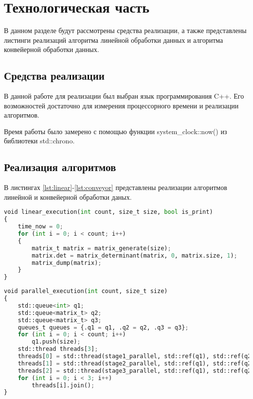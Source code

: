 \chapter{Технологическая часть}
\hspace{\parindent}В данном разделе будут рассмотрены средства реализации, а также представлены листинги реализаций алгоритма линейной обработки данных и алгоритма конвейерной обработки данных.

\section{Средства реализации}
\hspace{\parindent}В данной работе для реализации был выбран язык программирования C++. Его возможностей достаточно для измерения процессорного времени и реализации алгоритмов.


\hspace{\parindent}Время работы было замерено с помощью функции
system\_clock::now()\cite{proc-time} из библиотеки std::chrono.


\section{Реализация алгоритмов}
\hspace{\parindent}В листингах \ref{lst:linear}-\ref{lst:conveyor} представлены реализации алгоритмов линейной и конвейерной обработки даных.
\clearpage

\begin{center}
	\captionsetup{skip=0pt,justification=raggedright,singlelinecheck=off}
    \begin{lstlisting}[label=lst:linear,language=Python, caption=Алгоритм линейной обработки данных]
void linear_execution(int count, size_t size, bool is_print)
{
	time_now = 0;
	for (int i = 0; i < count; i++)
	{
		matrix_t matrix = matrix_generate(size);
		matrix.det = matrix_determinant(matrix, 0, matrix.size, 1);
		matrix_dump(matrix);
	}
}
    \end{lstlisting}
\end{center}


\begin{center}
	\captionsetup{skip=0pt,justification=raggedright,singlelinecheck=off}
    \begin{lstlisting}[label=lst:conveyor,language=Python,caption=Алгоритм конвейерной обработки данных]
void parallel_execution(int count, size_t size)
{
	std::queue<int> q1;
	std::queue<matrix_t> q2;
	std::queue<matrix_t> q3;
	queues_t queues = {.q1 = q1, .q2 = q2, .q3 = q3};
	for (int i = 0; i < count; i++)
		q1.push(size);
	std::thread threads[3];
	threads[0] = std::thread(stage1_parallel, std::ref(q1), std::ref(q2), std::ref(q3));
	threads[1] = std::thread(stage2_parallel, std::ref(q1), std::ref(q2), std::ref(q3));
	threads[2] = std::thread(stage3_parallel, std::ref(q1), std::ref(q2), std::ref(q3));
	for (int i = 0; i < 3; i++)
		threads[i].join();
}
\end{lstlisting}
\end{center}
\clearpage

